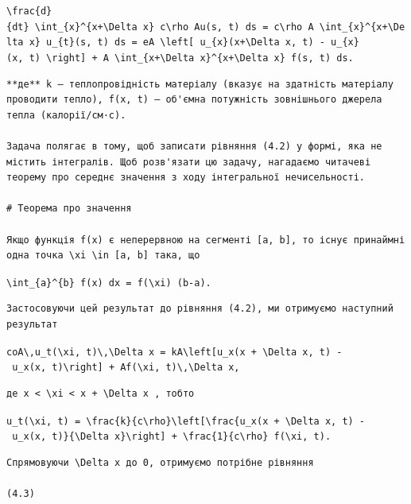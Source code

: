 \documentclass[
  ukrainian,
]{article}
\begin{document}
\texttt{\textbackslash{}frac\{d\}\{dt\}\ \textbackslash{}int\_\{x\}\^{}\{x+\textbackslash{}Delta\ x\}\ c\textbackslash{}rho\ Au(s,\ t)\ ds\ =\ c\textbackslash{}rho\ A\ \textbackslash{}int\_\{x\}\^{}\{x+\textbackslash{}Delta\ x\}\ u\_\{t\}(s,\ t)\ ds\ =\ eA\ \textbackslash{}left{[}\ u\_\{x\}(x+\textbackslash{}Delta\ x,\ t)\ -\ u\_\{x\}(x,\ t)\ \textbackslash{}right{]}\ +\ A\ \textbackslash{}int\_\{x+\textbackslash{}Delta\ x\}\^{}\{x+\textbackslash{}Delta\ x\}\ f(s,\ t)\ ds.}

\begin{verbatim}
**де** k — теплопровідність матеріалу (вказує на здатність матеріалу проводити тепло), f(x, t) — об'ємна потужність зовнішнього джерела тепла (калорії/см·с).

Задача полягає в тому, щоб записати рівняння (4.2) у формі, яка не містить інтегралів. Щоб розв'язати цю задачу, нагадаємо читачеві теорему про середнє значення з ходу інтегральної нечисельності.

# Теорема про значення

Якщо функція f(x) є неперервною на сегменті [a, b], то існує принаймні одна точка \xi \in [a, b] така, що
\end{verbatim}

\texttt{\textbackslash{}int\_\{a\}\^{}\{b\}\ f(x)\ dx\ =\ f(\textbackslash{}xi)\ (b-a).}

\begin{verbatim}
Застосовуючи цей результат до рівняння (4.2), ми отримуємо наступний результат
\end{verbatim}

\texttt{coA\textbackslash{},u\_t(\textbackslash{}xi,\ t)\textbackslash{},\textbackslash{}Delta\ x\ =\ kA\textbackslash{}left{[}u\_x(x\ +\ \textbackslash{}Delta\ x,\ t)\ -\ u\_x(x,\ t)\textbackslash{}right{]}\ +\ Af(\textbackslash{}xi,\ t)\textbackslash{},\textbackslash{}Delta\ x,}

\begin{verbatim}
де x < \xi < x + \Delta x , тобто
\end{verbatim}

\texttt{u\_t(\textbackslash{}xi,\ t)\ =\ \textbackslash{}frac\{k\}\{c\textbackslash{}rho\}\textbackslash{}left{[}\textbackslash{}frac\{u\_x(x\ +\ \textbackslash{}Delta\ x,\ t)\ -\ u\_x(x,\ t)\}\{\textbackslash{}Delta\ x\}\textbackslash{}right{]}\ +\ \textbackslash{}frac\{1\}\{c\textbackslash{}rho\}\ f(\textbackslash{}xi,\ t).}

\begin{verbatim}
Спрямовуючи \Delta x до 0, отримуємо потрібне рівняння

(4.3)
\end{verbatim}
\end{document}
